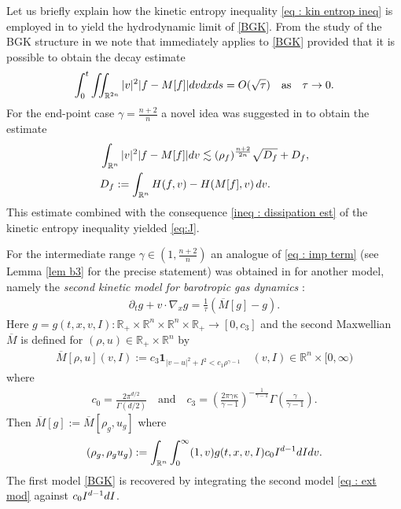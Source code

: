 \documentclass{amsart}
\theoremstyle{plain}
\theoremstyle{remark}
\numberwithin{equation}{section}
\newcommand{\p}{\partial}
\newcommand{\R}{\mathbb{R}}
\newcommand{\dx}{\textnormal{d}x}
\newcommand{\dv}{\textnormal{d}v}
\newcommand{\ds}{\textnormal{d}s}
\newcommand{\lt}{\left}
\newcommand{\rt}{\right}
\begin{document}
Let us briefly explain how the kinetic entropy inequality \eqref{eq : kin entrop ineq} is employed in \cite{berthelinvasseur2005} to yield the hydrodynamic limit of \eqref{BGK}. From the study of the BGK structure in \cite[Section 4.1.1]{berthelinvasseur2005} we note that \cite[Theorem 1.2]{berthelinvasseur2005} immediately applies to \eqref{BGK} provided that it is possible to obtain the decay estimate
\begin{equation}\label{eq:J}
        \int_0^t\iint_{\R^{2n}} |v|^2 |f- M[f]|\dv \dx \ds = O(\sqrt{\tau}) \quad \text{as} \quad \tau \to 0.
\end{equation}
For the end-point case $\gamma = \frac{n+2}{n}$ a novel idea was suggested in \cite[Proposition 4.1]{berthelinvasseur2005} to obtain the estimate
\begin{equation}
\label{eq : imp term}
\begin{split}
    &\int_{\R^n} |v|^2 |f - M[f]| \dv \lesssim (\rho_f)^{\frac{n+2}{2n}}\sqrt{D_f} + D_f,\\
    &D_f := \int_{\R^n} H(f,v) - H(M[f],v) \, \dv.
    \end{split}
\end{equation}
This estimate combined with the consequence \eqref{ineq : dissipation est} of the kinetic entropy inequality yielded \eqref{eq:J}.


For the intermediate range $\gamma \in \left(1,\frac{n+2}{n}\right)$ an analogue of \eqref{eq : imp term} (see Lemma \ref{lem b3} for the precise statement) was obtained in \cite[Section 4.1.2]{berthelinvasseur2005} for another model, namely the \emph{second kinetic model for barotropic gas dynamics} \cite[Section 3.1.3]{bouchut1999}:
\begin{align}
\label{eq : ext mod}
    \displaystyle\p_t g + v \cdot \nabla_x g = \frac{1}{\tau}(\overline{M}[g] - g).
\end{align}
Here $g = g(t,x,v,I):\R_+\times \R^n\times\R^n\times \R_+ \to [0,c_3]$ and the second Maxwellian $\overline{M}$ is defined for $(\rho,u)\in \R_+\times \R^n$ by
\begin{align}
\label{def : M bar}
    \overline{M}[\rho,u](v,I) := c_3 \mathbf{1}_{|v-u|^2 + I^2 < c_1 \rho^{\gamma-1}} \quad (v,I) \in \R^n \times [0,\infty)
\end{align}
where
\begin{align*}
    c_0=\frac{2\pi^{d/2}}{\Gamma(d/2)} \quad \text{and} \quad c_3 = \left(\frac{2\pi\gamma\kappa}{\gamma-1}\right)^{-\frac{1}{\gamma-1}} \Gamma\lt(\frac{\gamma}{\gamma-1}\rt).
\end{align*}
Then $\overline{M}[g] := \overline{M}[\rho_{g}, u_{g}]$ where
\begin{align*}
(\rho_{g},\rho_{g}u_{g}) := \displaystyle \int_{\R^{n}} \int_0^\infty (1,v)g(t,x,v,I)c_0 I^{d-1} \textnormal{d}I \dv.
\end{align*}
The first model \eqref{BGK} is recovered by integrating the second model \eqref{eq : ext mod} against $c_0 I^{d-1} \textnormal{d}I$.
\end{document}
